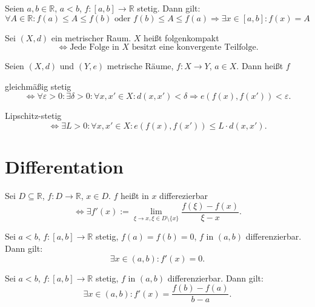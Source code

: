 \documentclass[]{scrartcl}
\newcommand{\R}{\ensuremath{\mathbb{R}}}
\begin{document}
\begin{satz}[Zwischenwertsatz]
Seien $a,b\in\R$, $a<b$, $f:\left[a,b\right]\to\R$ stetig. Dann gilt:
\[\forall A\in\R:f(a)\leq A\leq f(b)\text{ oder } f(b)\leq A\leq f(a) \Rightarrow \exists x\in\left[a,b\right]:f(x)=A\]
\end{satz}

\begin{definition}[Folgenkompakt]
Sei $(X,d)$ ein metrischer Raum. $X$ hei\ss t folgenkompakt
\[\Leftrightarrow\text{Jede Folge in $X$ besitzt eine konvergente Teilfolge.}\]
\end{definition}

\begin{definition}
Seien $(X,d)$ und $(Y,e)$ metrische R\"aume, $f:X\to Y$, $a\in X$. Dann hei\ss t $f$

gleichm\"a\ss ig stetig
\[\Leftrightarrow\forall\varepsilon>0:\exists\delta>0:\forall x,x'\in X:d(x,x')<\delta\Rightarrow e(f(x),f(x'))<\varepsilon.\]

Lipschitz-stetig
\[\Leftrightarrow\exists L>0:\forall x,x'\in X:e(f(x),f(x'))\leq L\cdot d(x,x').\]
\end{definition}

\section*{Differentation}
\begin{definition}[Differenzierbar]
Sei $D\subseteq\R$, $f:D\to\R$, $x\in D$. $f$ hei\ss t in $x$ differezierbar
\[\Leftrightarrow\exists f'(x):=\lim\limits_{\xi\to x,\xi\in D\setminus\{x\}}\frac{f(\xi)-f(x)}{\xi-x}.\]
\end{definition}

\begin{satz}
Sei $a<b$, $f:\left[a,b\right]\to\R$ stetig, $f(a)=f(b)=0$, $f$ in $(a,b)$ differenzierbar. Dann gilt:
\[\exists x\in(a,b):f'(x)=0.\]
\end{satz}

\begin{satz}[Mittelwertsatz]
Sei $a<b$, $f:\left[a,b\right]\to\R$ stetig, $f$ in $(a,b)$ differenzierbar. Dann gilt:
\[\exists x\in(a,b):f'(x)=\frac{f(b)-f(a)}{b-a}.\]
\end{satz}
\end{document}
